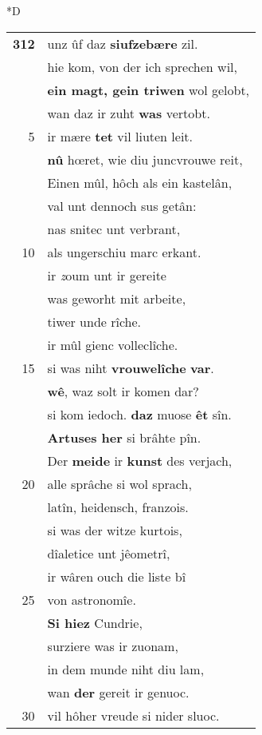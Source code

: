 \documentclass[8pt,a4paper,notitlepage]{article}
\begin{document}
\begin{table}[ht]
\begin{minipage}[t]{0.5\linewidth}
\small
\begin{center}*D
\end{center}
\begin{tabular}{rl}
\textbf{312} & unz ûf daz \textbf{siufzebære} zil.\\ 
 & hie kom, von der ich sprechen wil,\\ 
 & \textbf{ein magt, gein triwen} wol gelobt,\\ 
 & wan daz ir zuht \textbf{was} vertobt.\\ 
5 & ir mære \textbf{tet} vil liuten leit.\\ 
 & \textbf{nû} hœret, wie diu juncvrouwe reit,\\ 
 & Einen mûl, hôch als ein kastelân,\\ 
 & val unt dennoch sus getân:\\ 
 & nas snitec unt verbrant,\\ 
10 & als ungerschiu marc erkant.\\ 
 & ir \textit{z}oum unt ir gereite\\ 
 & was geworht mit arbeite,\\ 
 & tiwer unde rîche.\\ 
 & ir mûl gienc volleclîche.\\ 
15 & si was niht \textbf{vrouwelîche} \textbf{var}.\\ 
 & \textbf{wê}, waz solt ir komen dar?\\ 
 & si kom iedoch. \textbf{daz} muose \textbf{êt} sîn.\\ 
 & \textbf{Artuses her} si brâhte pîn.\\ 
 & Der \textbf{meide} ir \textbf{kunst} des verjach,\\ 
20 & alle sprâche si wol sprach,\\ 
 & latîn, heidensch, franzois.\\ 
 & si was der witze kurtois,\\ 
 & dîaletice unt jêometrî,\\ 
 & ir wâren ouch die liste bî\\ 
25 & von astronomîe.\\ 
 & \textbf{Si hiez} Cundrie,\\ 
 & surziere was ir zuonam,\\ 
 & in dem munde niht diu lam,\\ 
 & wan \textbf{der} gereit ir genuoc.\\ 
30 & vil hôher vreude si nider sluoc.\\ 

\end{tabular}
\end{minipage}
\end{table}
\end{document}
